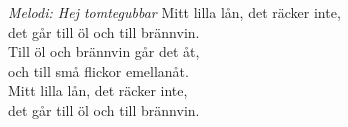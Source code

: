 {\footnotesize\textit{Melodi: Hej tomtegubbar}}
\revrpt Mitt lilla lån, det räcker inte,\\
det går till öl och till brännvin. \rpt\\
Till öl och brännvin går det åt,\\
och till små flickor emellanåt.\\
Mitt lilla lån, det räcker inte,\\
det går till öl och till brännvin.
\par
\vspace{10pt}

